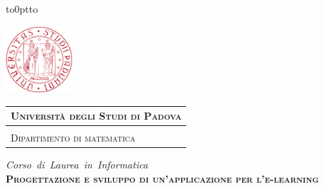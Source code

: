 \begin{titlepage} %
\begin{center}
\vbox to0pt{\vbox to\vss}

\hspace{0.5cm}
\begin{minipage}{.20\textwidth}
  \includegraphics[height=2.5cm]{images/unipd-red}
\end{minipage}\begin{minipage}{.90\textwidth}
  \begin{table}[H]
  \begin{tabular}{l}
  \scshape{\Large{\bfseries{Università degli Studi di Padova}}} \\
  \hline \\
  \scshape{\Large{Dipartimento di matematica}} \\
  \end{tabular}
  \end{table}
\end{minipage}

\emph{\Large{Corso~di~Laurea~in~Informatica}} \\
\vspace{1.5cm}
\scshape{\Large{\bfseries{Progettazione e sviluppo di un'applicazione per l'e-learning}}} \\
\end{center}


\end{titlepage}
